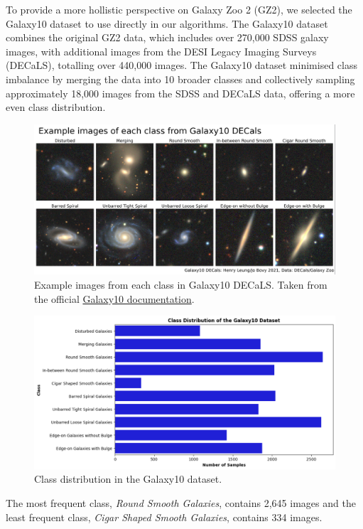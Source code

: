 \documentclass[10pt,twocolumn,letterpaper]{article}
\begin{document}
To provide a more hollistic perspective on Galaxy Zoo 2 (GZ2), we selected the Galaxy10 dataset to use directly in our algorithms.
The Galaxy10 dataset combines the original GZ2 data, which includes over 270,000 SDSS galaxy images, with additional images from the DESI Legacy Imaging Surveys (DECaLS), totalling over 440,000 images.
The Galaxy10 dataset minimised class imbalance by merging the data into 10 broader classes and collectively sampling approximately 18,000 images from the SDSS and DECaLS data, offering a more even class distribution.
\begin{figure}[htbp]
    \includegraphics[width=\linewidth]{galaxy10_images.png}
    \caption{Example images from each class in Galaxy10 DECaLS. Taken from the official \href{https://astronn.readthedocs.io/en/latest/galaxy10.html}{Galaxy10 documentation}.}
    \label{fig:galaxyimgs}
  \end{figure}
  \begin{figure}[htbp]
    \includegraphics[width=\linewidth]{galaxy_distribution2.png}
    \caption{Class distribution in the Galaxy10 dataset.}
    \label{fig:featuredist2}
  \end{figure}
  \noindent The most frequent class, \textit{Round Smooth Galaxies}, contains 2,645 images and the least frequent class, \textit{Cigar Shaped Smooth Galaxies}, contains 334 images.
\end{document}
